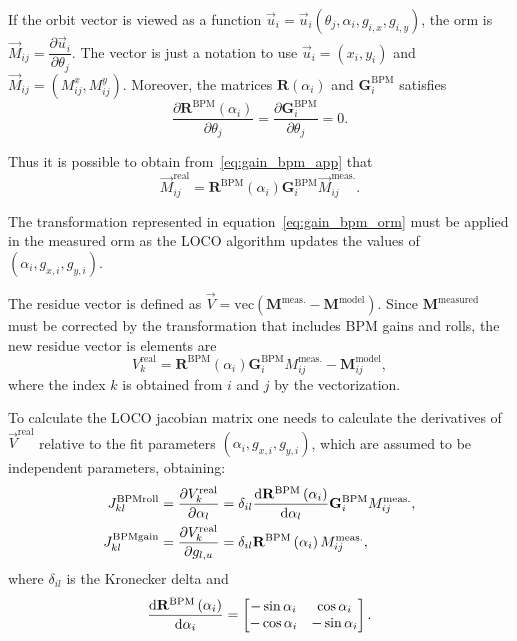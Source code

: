 If the orbit vector is viewed as a function $\vec{u}_i = \vec{u}_i\left(\theta_j, \alpha_i, g_{i, x}, g_{i, y}\right)$, the \gls{orm} is $\vec{M}_{ij} = \dfrac{\partial \vec{u}_i}{\partial \theta_j}$. The vector is just a notation to use $\vec{u}_i = (x_i, y_i)$ and $\vec{M}_{ij} = \left(M_{ij}^x, M_{ij}^y\right)$. Moreover, the matrices $\mathbf{R}\left(\alpha_i\right)$ and $\mathbf{G}_{i}^{\mathrm{BPM}}$ satisfies
\begin{equation*}
\dfrac{\partial \mathbf{R}^\mathrm{BPM}\left(\alpha_i\right)}{ \partial  \theta_j} = \dfrac{\partial \mathbf{G}_{i}^{\mathrm{BPM}}}{ \partial \theta_j} = 0.
\end{equation*}

Thus it is possible to obtain from~\eqref{eq:gain_bpm_app} that
\begin{equation}
    \vec{M}_{ij}^{\mathrm{real}} = \mathbf{R}^\mathrm{BPM}\left(\alpha_i\right) \mathbf{G}_{i}^{\mathrm{BPM}} \vec{M}_{ij}^{\mathrm{meas.}}.
    \label{eq:gain_bpm_orm}
\end{equation}

The transformation represented in equation~\eqref{eq:gain_bpm_orm} must be applied in the measured \gls{orm} as the LOCO algorithm updates the values of $\left(\alpha_i, g_{x, i}, g_{y, i}\right)$. 

The residue vector is defined as $\vec{V} = \mathrm{vec}\left(\mathbf{M}^{\mathrm{meas.}} - \mathbf{M}^{\mathrm{model}}\right)$. Since $\mathbf{M}^{\mathrm{measured}}$ must be corrected by the transformation that includes BPM gains and rolls, the new residue vector is elements are 
\begin{equation}
    {V}_k^{\mathrm{real}} = \mathbf{R}^\mathrm{BPM}\left(\alpha_i\right) \mathbf{G}_{i}^{\mathrm{BPM}} {M}^{\mathrm{meas.}}_{ij} - \mathbf{M}^{\mathrm{model}}_{ij},
\end{equation}
where the index $k$ is obtained from $i$ and $j$ by the vectorization. 

To calculate the LOCO jacobian matrix one needs to calculate the derivatives of $\vec{V}^{\mathrm{real}}$ relative to the fit parameters $\left(\alpha_i, g_{x, i}, g_{y, i}\right)$, which are assumed to be independent parameters, obtaining:
\begin{align}
    J_{kl}^{\mathrm{BPMroll}} = \dfrac{\partial {V}_k^{\mathrm{real}}}{\partial \alpha_l} &= \delta_{il}\dfrac{\mathrm{d} \mathbf{R}^\mathrm{BPM}\left(\alpha_i\right)}{\mathrm{d} \alpha_l} \mathbf{G}_{i}^{\mathrm{BPM}} {M}^{\mathrm{meas.}}_{ij}, \\
    J_{kl}^{\mathrm{BPMgain}} = \dfrac{\partial {V}_k^{\mathrm{real}}}{\partial g_{l, u}} &= \delta_{il}\mathbf{R}^\mathrm{BPM}\left(\alpha_i\right){M}^{\mathrm{meas.}}_{ij},
\end{align}
where $\delta_{il}$ is the Kronecker delta and 
\begin{equation*}
    \dfrac{\mathrm{d} \mathbf{R}^\mathrm{BPM}\left(\alpha_i\right)}{\mathrm{d} \alpha_i} =
    \begin{bmatrix}
    -\sin\alpha_i & \cos\alpha_i \\
     -\cos\alpha_i & -\sin\alpha_i 
    \end{bmatrix}.
\end{equation*}

